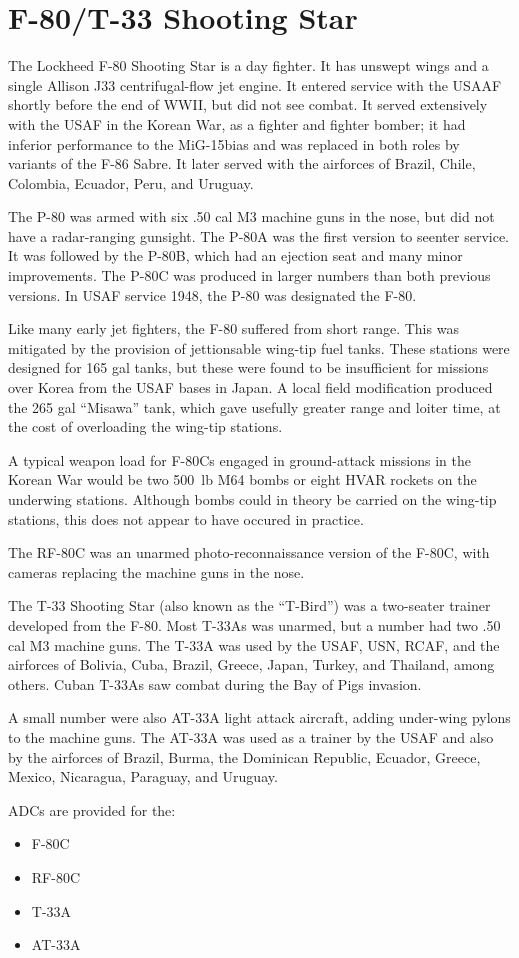 \section*{F-80/T-33 Shooting Star}

The Lockheed F-80 Shooting Star is a day fighter. It has unswept wings and a single Allison J33 centrifugal-flow jet engine. It entered service with the USAAF shortly before the end of WWII, but did not see combat. It served extensively with the USAF in the Korean War, as a fighter and fighter bomber; it had inferior performance to the MiG-15bias and was replaced in both roles by variants of the F-86 Sabre. It later served with the airforces of Brazil, Chile, Colombia, Ecuador, Peru, and Uruguay.

The P-80 was armed with six .50 cal M3 machine guns in the nose, but did not have a radar-ranging gunsight. The P-80A was the first version to seenter service. It was followed by the P-80B, which had an ejection seat and many minor improvements. The P-80C was produced in larger numbers than both previous versions. In USAF service 1948, the P-80 was designated the F-80.

Like many early jet fighters, the F-80 suffered from short range. This was mitigated by the provision of jettionsable wing-tip fuel tanks. These stations were designed for 165 gal tanks, but these were found to be insufficient for missions over Korea from the USAF bases in Japan. A local field modification produced the 265 gal “Misawa” tank, which gave usefully greater range and loiter time, at the cost of overloading the wing-tip stations.

A typical weapon load for F-80Cs engaged in ground-attack missions in the Korean War would be two 500~lb M64 bombs or eight HVAR rockets on the underwing stations. Although bombs could in theory be carried on the wing-tip stations, this does not appear to have occured in practice.

The RF-80C was an unarmed photo-reconnaissance version of the F-80C, with cameras replacing the machine guns in the nose.

The T-33 Shooting Star (also known as the “T-Bird”) was a two-seater trainer developed from the F-80. Most T-33As was unarmed, but a number had two .50 cal M3 machine guns. The T-33A was used by the USAF, USN, RCAF, and the airforces of Bolivia, Cuba, Brazil, Greece, Japan, Turkey, and Thailand, among others. Cuban T-33As saw combat during the Bay of Pigs invasion.

A small number were also AT-33A light attack aircraft, adding under-wing pylons to the machine guns. The AT-33A was used as a trainer by the USAF and also by the airforces of Brazil, Burma, the Dominican Republic, Ecuador, Greece, Mexico, Nicaragua, Paraguay, and Uruguay.

ADCs are provided for the:
\begin{itemize}
\item F-80C
\item RF-80C
\item T-33A
\item AT-33A
\end{itemize}
